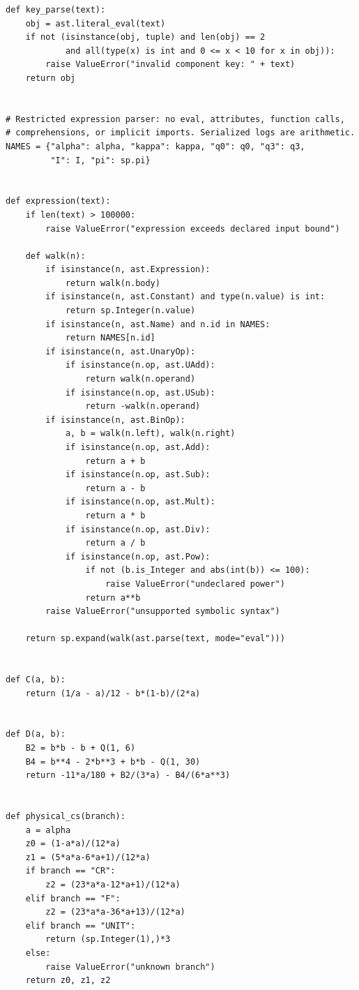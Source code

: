\documentclass[11pt,a4paper]{article}
\theoremstyle{plain}
\theoremstyle{definition}
\theoremstyle{remark}
\numberwithin{equation}{section}
\begin{document}
\begin{lstlisting}[caption={Consolidated exact checker and coverage-aware optional replay.},
                  label={lst:program}]
def key_parse(text):
    obj = ast.literal_eval(text)
    if not (isinstance(obj, tuple) and len(obj) == 2
            and all(type(x) is int and 0 <= x < 10 for x in obj)):
        raise ValueError("invalid component key: " + text)
    return obj


# Restricted expression parser: no eval, attributes, function calls,
# comprehensions, or implicit imports. Serialized logs are arithmetic.
NAMES = {"alpha": alpha, "kappa": kappa, "q0": q0, "q3": q3,
         "I": I, "pi": sp.pi}


def expression(text):
    if len(text) > 100000:
        raise ValueError("expression exceeds declared input bound")

    def walk(n):
        if isinstance(n, ast.Expression):
            return walk(n.body)
        if isinstance(n, ast.Constant) and type(n.value) is int:
            return sp.Integer(n.value)
        if isinstance(n, ast.Name) and n.id in NAMES:
            return NAMES[n.id]
        if isinstance(n, ast.UnaryOp):
            if isinstance(n.op, ast.UAdd):
                return walk(n.operand)
            if isinstance(n.op, ast.USub):
                return -walk(n.operand)
        if isinstance(n, ast.BinOp):
            a, b = walk(n.left), walk(n.right)
            if isinstance(n.op, ast.Add):
                return a + b
            if isinstance(n.op, ast.Sub):
                return a - b
            if isinstance(n.op, ast.Mult):
                return a * b
            if isinstance(n.op, ast.Div):
                return a / b
            if isinstance(n.op, ast.Pow):
                if not (b.is_Integer and abs(int(b)) <= 100):
                    raise ValueError("undeclared power")
                return a**b
        raise ValueError("unsupported symbolic syntax")

    return sp.expand(walk(ast.parse(text, mode="eval")))


def C(a, b):
    return (1/a - a)/12 - b*(1-b)/(2*a)


def D(a, b):
    B2 = b*b - b + Q(1, 6)
    B4 = b**4 - 2*b**3 + b*b - Q(1, 30)
    return -11*a/180 + B2/(3*a) - B4/(6*a**3)


def physical_cs(branch):
    a = alpha
    z0 = (1-a*a)/(12*a)
    z1 = (5*a*a-6*a+1)/(12*a)
    if branch == "CR":
        z2 = (23*a*a-12*a+1)/(12*a)
    elif branch == "F":
        z2 = (23*a*a-36*a+13)/(12*a)
    elif branch == "UNIT":
        return (sp.Integer(1),)*3
    else:
        raise ValueError("unknown branch")
    return z0, z1, z2



\end{lstlisting}
\end{document}
